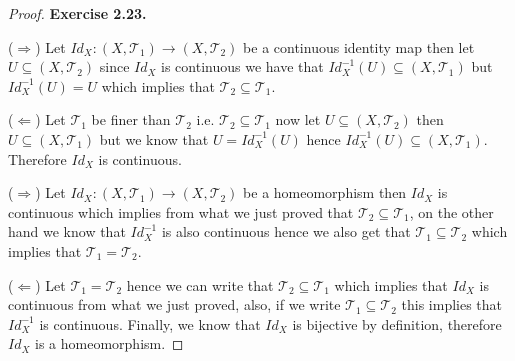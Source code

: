 \documentclass[11pt]{article}
\newcommand{\Topo}{\mathcal{T}}
\theoremstyle{definition}
\begin{document}
\begin{proof}{\textbf{Exercise 2.23.}}

    ($\Rightarrow$) Let $Id_X: (X,\Topo_1) \to (X,\Topo_2)$ be a continuous
    identity map then let $U \subseteq (X,\Topo_2)$ since $Id_X$ is continuous
    we have that $Id_X^{-1}(U) \subseteq (X,\Topo_1)$ but $Id_X^{-1}(U) = U$
    which implies that $\Topo_2 \subseteq \Topo_1$.

    ($\Leftarrow$) Let $\Topo_1$ be finer than $\Topo_2$ i.e.
    $\Topo_2 \subseteq \Topo_1$ now let $U \subseteq (X, \Topo_2)$
    then $U \subseteq (X, \Topo_1)$ but we know that $U = Id_X^{-1}(U)$ hence
    $Id_X^{-1}(U) \subseteq (X, \Topo_1)$. Therefore $Id_X$ is continuous.

    ($\Rightarrow$) Let $Id_X: (X,\Topo_1) \to (X,\Topo_2)$ be a homeomorphism
    then $Id_X$ is continuous which implies from what we just proved that
    $\Topo_2 \subseteq \Topo_1$, on the other hand we know that $Id_X^{-1}$ is
    also continuous hence we also get that $\Topo_1 \subseteq \Topo_2$ which
    implies that $\Topo_1 = \Topo_2$.

    ($\Leftarrow$) Let $\Topo_1 = \Topo_2$ hence we can write that
    $\Topo_2 \subseteq \Topo_1$ which implies that $Id_X$ is continuous
    from what we just proved, also, if we write $\Topo_1 \subseteq \Topo_2$
    this implies that $Id_X^{-1}$ is continuous. Finally, we know that $Id_X$
    is bijective by definition, therefore $Id_X$ is a homeomorphism.
\end{proof}
\cleardoublepage
\end{document}
